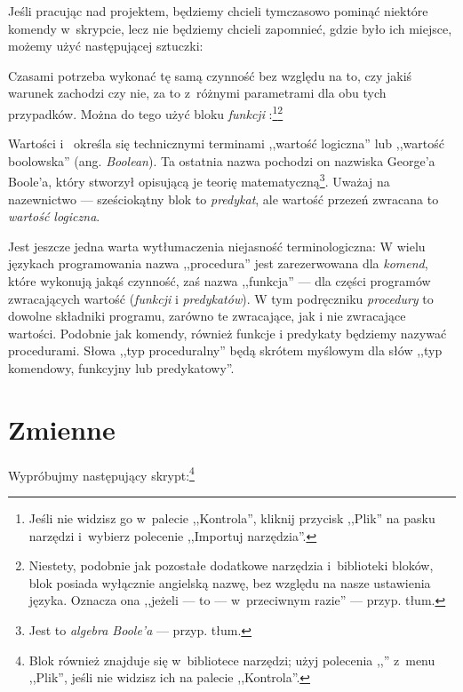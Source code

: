 \documentclass[a4paper]{report}
\begin{document}

Jeśli pracując nad projektem, będziemy chcieli tymczasowo pominąć niektóre komendy w~skrypcie, lecz nie będziemy chcieli zapomnieć, gdzie było ich miejsce, możemy użyć następującej sztuczki:\nopagebreak


Czasami potrzeba wykonać tę samą czynność bez względu na to, czy jakiś warunek zachodzi czy nie, za to z~różnymi parametrami dla obu tych przypadków. Można do tego użyć bloku \emph{funkcji} :\footnote{\onehalfspacing Jeśli nie widzisz go w~palecie ,,Kontrola'', kliknij przycisk ,,Plik''  na pasku narzędzi i~wybierz polecenie ,,Importuj narzędzia''.}\footnote{Niestety, podobnie jak pozostałe dodatkowe narzędzia i~biblioteki bloków, blok  posiada wyłącznie angielską nazwę, bez względu na nasze ustawienia języka. Oznacza ona ,,jeżeli --- to --- w~przeciwnym razie'' --- przyp. tłum.}\nopagebreak


Wartości  i~ określa się technicznymi terminami ,,wartość logiczna'' lub ,,wartość boolowska'' (ang. \textit{Boolean}). Ta ostatnia nazwa pochodzi on nazwiska George'a Boole'a, który stworzył opisującą je teorię matematyczną\footnote{Jest to \emph{algebra Boole'a} --- przyp. tłum.}. Uważaj na nazewnictwo --- sześciokątny blok to \emph{predykat}, ale wartość przezeń zwracana to \emph{wartość logiczna}.

Jest jeszcze jedna warta wytłumaczenia niejasność terminologiczna:  W wielu językach programowania nazwa ,,procedura'' jest zarezerwowana dla \emph{komend}, które wykonują jakąś czynność, zaś nazwa ,,funkcja'' --- dla części programów zwracających wartość (\emph{funkcji} i \emph{predykatów}). W tym podręczniku \emph{procedury} to dowolne składniki programu, zarówno te zwracające, jak i nie zwracające wartości. Podobnie jak komendy, również funkcje i predykaty będziemy nazywać procedurami. Słowa ,,typ proceduralny'' będą skrótem myślowym dla słów ,,typ komendowy, funkcyjny lub predykatowy''.

\section{Zmienne}

Wypróbujmy następujący skrypt:\footnote{Blok \footnotemark{} również znajduje się w~bibliotece narzędzi; użyj polecenia ,,'' z~menu ,,Plik'', jeśli nie widzisz ich na palecie ,,Kontrola''.}\nopagebreak
\end{document}
